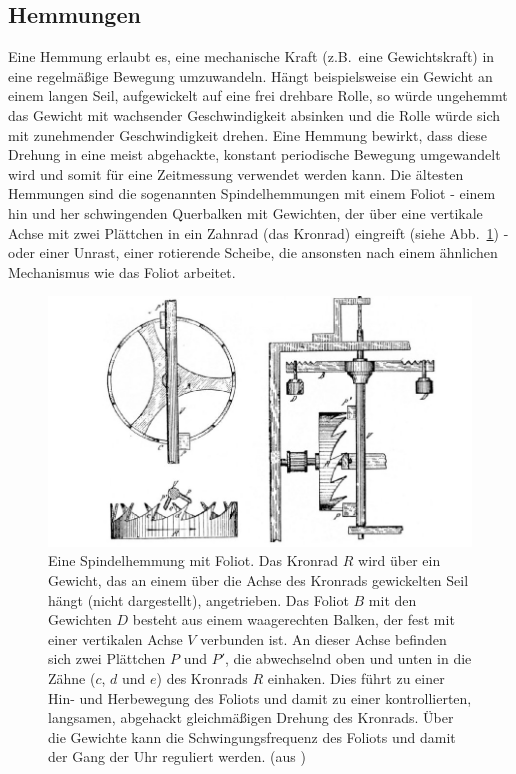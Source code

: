\subsection{Hemmungen}

Eine Hemmung 
erlaubt es, eine mechanische Kraft (z.B.\ eine Gewichtskraft) in eine regelm\"a\ss ige Bewegung
umzuwandeln. H\"angt beispielsweise ein Gewicht an einem langen Seil, aufgewickelt auf eine
frei drehbare Rolle, so w\"urde ungehemmt das Gewicht mit wachsender Geschwindigkeit
absinken und die Rolle w\"urde sich mit zunehmender Geschwindigkeit drehen. Eine Hemmung
bewirkt, dass diese Drehung in eine meist abgehackte, konstant periodische Bewegung umgewandelt wird
und somit f\"ur eine Zeitmessung verwendet werden kann. Die \"altesten Hemmungen sind die
sogenannten Spindelhemmungen 
mit einem Foliot - einem hin und her schwingenden Querbalken mit Gewichten, 
der \"uber eine vertikale Achse mit zwei Pl\"attchen in ein Zahnrad 
(das Kronrad) eingreift (siehe Abb.\ \ref{fig_Foliot}) - oder
einer Unrast, einer rotierende Scheibe, die ansonsten nach einem 
\"ahnlichen Mechanismus wie das Foliot arbeitet.

\begin{figure}[htb]
\includegraphics[scale=0.4]{./Bilder/Foliot.jpg}
\caption{\label{fig_Foliot}%
Eine Spindelhemmung mit Foliot. Das Kronrad $R$ wird \"uber ein Gewicht, das an einem \"uber die
Achse des Kronrads gewickelten Seil h\"angt (nicht dargestellt), angetrieben. Das Foliot $B$ mit den Gewichten $D$
besteht aus einem waagerechten Balken, der fest mit einer vertikalen Achse $V$ verbunden ist. 
An dieser Achse befinden sich zwei Pl\"attchen $P$ und $P'$, die abwechselnd oben und unten in die
Z\"ahne ($c$, $d$ und $e$) des Kronrads $R$ einhaken. 
Dies f\"uhrt zu einer Hin- und Herbewegung des Foliots und damit
zu einer kontrollierten, langsamen, abgehackt gleichm\"a\ss igen Drehung des Kronrads. \"Uber die Gewichte kann
die Schwingungsfrequenz des Foliots und damit der Gang der Uhr reguliert werden.
(aus \cite{Foliot})}
\end{figure}
 
